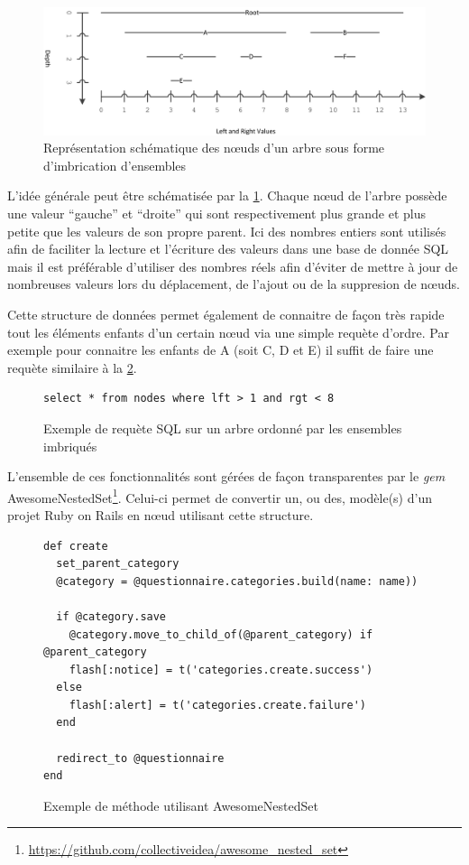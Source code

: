 \documentclass[12pt,a4paper]{book}
\begin{document}
\begin{figure}[htp]
\centering
\includegraphics[scale=.12]{img/nested1.png}
\caption{Représentation schématique des nœuds d'un arbre sous forme d'imbrication d'ensembles}
\label{img:nested1}
\end{figure}

L'idée générale peut être schématisée par la \cref{img:nested1}. Chaque nœud de l'arbre possède une valeur ``gauche'' et ``droite'' qui sont respectivement plus grande et plus petite que les valeurs de son propre parent. Ici des nombres entiers sont utilisés afin de faciliter la lecture et l'écriture des valeurs dans une base de donnée SQL mais il est préférable d'utiliser des nombres réels afin d'éviter de mettre à jour de nombreuses valeurs lors du déplacement, de l'ajout ou de la suppresion de nœuds.

Cette structure de données permet également de connaitre de façon très rapide tout les éléments enfants d'un certain nœud via une simple requète d'ordre. Par exemple pour connaitre les enfants de A (soit C, D et E) il suffit de faire une requète similaire à la \cref{fig.nestedsql}.

\begin{figure}[h]
\lstset{language=sql}
\begin{lstlisting}
select * from nodes where lft > 1 and rgt < 8
\end{lstlisting}
 \caption{Exemple de requète SQL sur un arbre ordonné par les ensembles imbriqués}
 \label{fig.nestedsql}
\end{figure}

L'ensemble de ces fonctionnalités sont gérées de façon transparentes par le \textit{gem} AwesomeNestedSet\footnote{\url{https://github.com/collectiveidea/awesome_nested_set}}. Celui-ci permet de convertir un, ou des, modèle(s) d'un projet Ruby on Rails en nœud utilisant cette structure.

\begin{figure}[h]
\lstset{language=ruby}
\begin{lstlisting}
def create
  set_parent_category
  @category = @questionnaire.categories.build(name: name))

  if @category.save
    @category.move_to_child_of(@parent_category) if @parent_category
    flash[:notice] = t('categories.create.success')
  else
    flash[:alert] = t('categories.create.failure')
  end

  redirect_to @questionnaire
end
\end{lstlisting}
 \caption{Exemple de méthode utilisant AwesomeNestedSet}
 \label{fig.nestedrail}
\end{figure}
\end{document}

